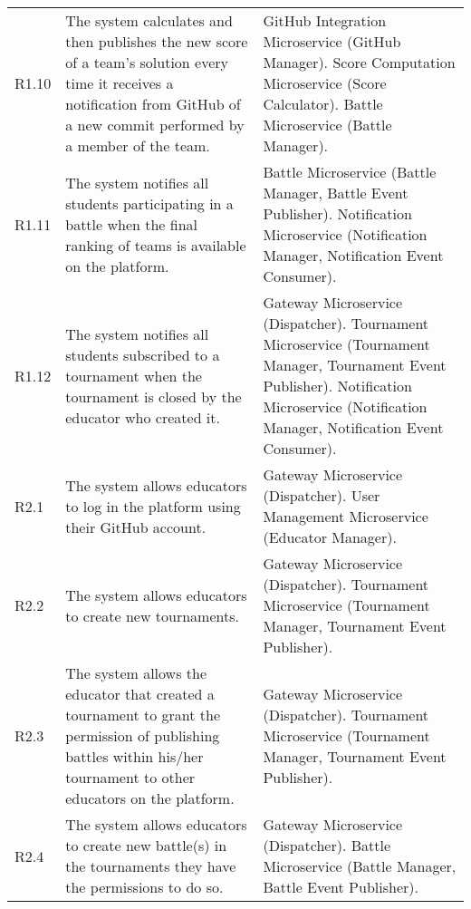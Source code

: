 \begin{longtable}{p{1cm} p{5.5cm} p{6cm}}
 	R1.10 & The system calculates and then publishes the new score of a team’s solution every time it	receives a notification from GitHub of a new commit performed by a member of the team. & GitHub Integration Microservice (GitHub Manager). \newline Score Computation Microservice (Score Calculator). \newline Battle Microservice (Battle Manager).\\
 	
 	R1.11 & The system notifies all students participating in a battle when the final ranking of teams is	available on the platform. & Battle Microservice (Battle Manager, Battle Event Publisher). \newline Notification Microservice (Notification Manager, Notification Event Consumer).\\
 	
 	R1.12 & The system notifies all students subscribed to a tournament when the tournament is closed by the educator who created it. & Gateway Microservice (Dispatcher). \newline Tournament Microservice (Tournament Manager, Tournament Event Publisher). \newline Notification Microservice (Notification Manager, Notification Event Consumer).\\
 	
 	R2.1 & The system allows educators to log in the platform using their GitHub account. & Gateway Microservice (Dispatcher). \newline User Management Microservice (Educator Manager).\\
 	
 	R2.2 & The system allows educators to create new tournaments. & Gateway Microservice (Dispatcher). \newline Tournament Microservice (Tournament Manager, Tournament Event Publisher).\\
 	
 	R2.3 & The system allows the educator that created a tournament to grant the permission of publishing battles within his/her tournament to other educators on the platform. & Gateway Microservice (Dispatcher). \newline Tournament Microservice (Tournament Manager, Tournament Event Publisher).\\
 	
 	R2.4 & The system allows educators to create new battle(s) in the tournaments they have the permissions to do so. & Gateway Microservice (Dispatcher). \newline Battle Microservice (Battle Manager, Battle Event Publisher).\\
 	

\end{longtable}

